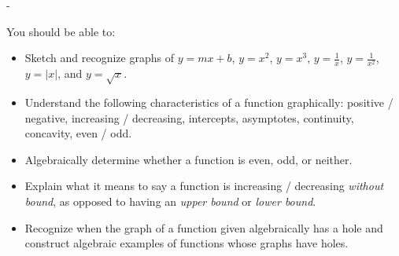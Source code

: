 \documentclass{article}
\makeatletter
\newlength{\tipmargin}
\renewenvironment{framed}{
  \setlength{\tipmargin}{\textwidth-\linewidth}
  \advance\@totalleftmargin-\tipmargin
  \def\FrameCommand{\hspace{\tipmargin}\fbox}%
  \advance\linewidth\tipmargin
  \MakeFramed {\advance\hsize-\width \FrameRestore}%
}
{\endMakeFramed}
\makeatother
\begin{document}

\begin{problemonly}
  \begin{framed}

You should be able to:
    \begin{itemize}[topsep=0pt,partopsep=0pt,parsep=8pt,itemsep=0pt]
    \item Sketch and recognize graphs of $y = mx + b$, $y = x^2$, $y = x^3$, $y = \frac{1}{x}$, $y = \frac{1}{x^2}$, $y = |x|$, and $y = \sqrt{x}$.

    \item Understand the following characteristics of a function graphically: positive / negative, increasing / decreasing, intercepts, asymptotes, continuity, concavity, even / odd.

    \item Algebraically determine whether a function is even, odd, or neither.

    \item Explain what it means to say a function is increasing / decreasing \emph{without bound}, as opposed to having an \emph{upper bound} or \emph{lower bound}.

    \item Recognize when the graph of a function given algebraically has a hole and construct algebraic examples of functions whose graphs have holes.

    \end{itemize}
  \end{framed}
\end{problemonly}
\end{document}
